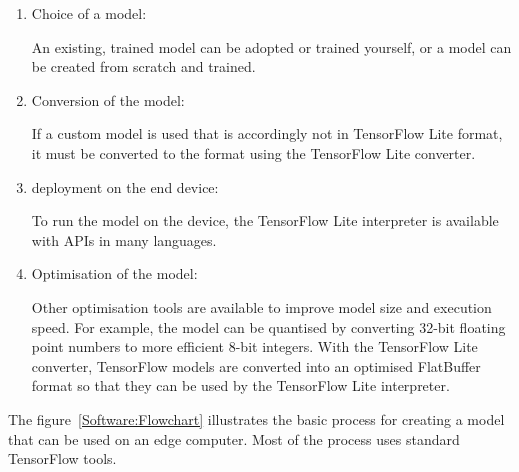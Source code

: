 \begin{enumerate}
  \item Choice of a model:
  
        An existing, trained model can be adopted or trained yourself, or a model can be created from scratch and trained.
  \item Conversion of the model:
  
        If a custom model is used that is accordingly not in TensorFlow Lite format, it must be converted to the format using the TensorFlow Lite converter.
        
  \item deployment on the end device:
  
         To run the model on the device, the TensorFlow Lite interpreter is available with APIs in many languages.
  
  \item Optimisation of the model:
  
         Other optimisation tools are available to improve model size and execution speed. For example, the model can be quantised by converting 32-bit floating point numbers to more efficient 8-bit integers. With the TensorFlow Lite converter, TensorFlow models are converted into an optimised FlatBuffer format so that they can be used by the TensorFlow Lite interpreter. \cite{GoogleTensorFlowLite:2021}       
\end{enumerate}


The figure~\ref{Software:Flowchart} illustrates the basic process for creating a model that can be used on an edge computer. Most of the process uses standard TensorFlow tools. 

